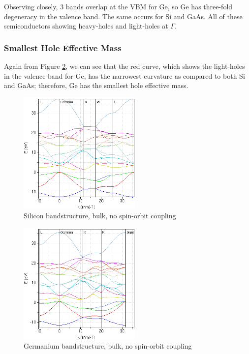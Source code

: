 \documentclass{IEEEtran}
\begin{document}
Observing closely, 3 bands overlap at the VBM for Ge, so Ge has three-fold degeneracy in the valence band. The same occurs for Si and GaAs. All of these semiconductors showing heavy-holes and light-holes at \(\Gamma\).


\subsubsection{Smallest Hole Effective Mass}

Again from Figure \ref{fig:ge-first-set}, we can see that the red curve, which shows the light-holes in the valence band for Ge, has the narrowest curvature as compared to both Si and GaAs; therefore, Ge has the smallest hole effective mass.

\begin{figure}[!ht] 
    \centering
    \includegraphics*[width = 6cm]{si-bands-firstset.png}
    \caption{Silicon bandstructure, bulk, no spin-orbit coupling}
    \label{fig:si-first-set}
\end{figure}    

\begin{figure}[!ht] 
    \centering
    \includegraphics*[width = 6cm]{ge-bands-firstset.png}
    \caption{Germanium bandstructure, bulk, no spin-orbit coupling}
    \label{fig:ge-first-set}
\end{figure}    
\end{document}
